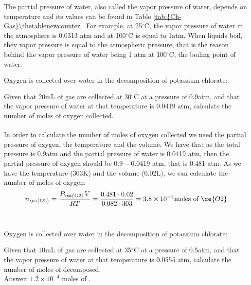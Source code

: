 \documentclass[main.tex]{subfiles}
\newcommand\chapterlabel{Ch-Gas}\setcounter{figurenewcounter}{0}\setcounter{tablenewcounter}{0}\setcounter{formulanewcounter}{0}
\begin{document}
\begin{description}
The partial pressure of water, also called the vapor pressure of water, depends on temperature and its values can be found in Table \ref{tab:{\chapterlabel}\thetablenewcounter}. For example, at 25$^{\circ}$C, the vapor pressure of water in the atmosphere is 0.0313 atm and at 100$^{\circ}$C is equal to 1atm. When liquids boil, they vapor pressure is equal to the atmospheric pressure, that is the reason behind the vapor pressure of water being 1 atm at 100$^{\circ}$C, the boiling point of water.

\begin{example} %
Oxygen is collected over water in the decomposition of potassium chlorate:
\begin{center}\end{center}
Given that 20mL of gas are collected at 30$^{\circ}$C at a pressure of 0.9atm, and that the vapor pressure of water at that temperature is 0.0419 atm, calculate the number of moles of oxygen collected.
\\
\\
In order to calculate the number of moles of oxygen collected we need the partial pressure of oxygen, the temperature and the volume. We have that as the total pressure is 0.9atm and the partial pressure of water is 0.0419 atm, then the partial pressure of oxygen should be $0.9-0.0419$ atm, that is 0.481 atm. As we have the temperature (303K) and the volume (0.02L), we can calculate the number of moles of oxygen:
\[n_{\ce{O2}}=\frac{P_{\ce{O2}}V}{RT}=\frac{0.481\cdot 0.02}{0.082\cdot 303}=3.8\times 10^{-4}\text{moles of }\ce{O2}\]
\\
\faDiamond\ \\
Oxygen is collected over water in the decomposition of potassium chlorate:
\begin{center}\end{center}
Given that 10mL of gas are collected at 35$^{\circ}$C at a pressure of 0.5atm, and that the vapor pressure of water at that temperature is 0.0555 atm, calculate the number of moles of  decomposed.
\\
\flushright Answer: $1.2\times 10^{-4}$ moles of .
\end{example}%




\end{description}
\end{document}
